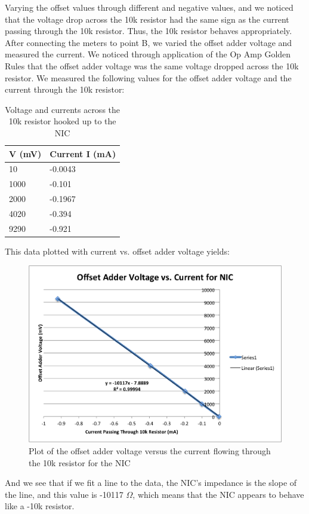 \documentclass{article}
\begin{document}
    Varying the offset values through different and negative values, and we noticed that the voltage drop across the 10k resistor had the same sign as the current passing through the 10k resistor. Thus, the 10k resistor behaves appropriately.\\\indent After connecting the meters to point B, we varied the offset adder voltage and measured the current. We noticed through application of the Op Amp Golden Rules that the offset adder voltage was the same voltage dropped across the 10k resistor. We measured the following values for the offset adder voltage and the current through the 10k resistor:
        \begin{table}[H]
        \centering
        \caption{Voltage and currents across the 10k resistor hooked up to the NIC}
        \label{my-label}
        \begin{tabular}{ll}
        \textbf{V (mV)} & \textbf{Current I (mA)} \\ \hline
        10 & -0.0043 \\
        1000 & -0.101 \\
        2000 & -0.1967 \\
        4020 & -0.394 \\
        9290 & -0.921
        \end{tabular}
        \end{table}
    This data plotted with current vs. offset adder voltage yields:
        \begin{figure}[H]
            \centering
            \includegraphics[scale = 0.5]{1b.png}
            \caption{Plot of the offset adder voltage versus the current flowing through the 10k resistor for the NIC}
            \label{fig:my_label}
        \end{figure}
    And we see that if we fit a line to the data, the NIC's impedance is the slope of the line, and this value is -10117 $\Omega$, which means that the NIC appears to behave like a -10k resistor.
\end{document}
